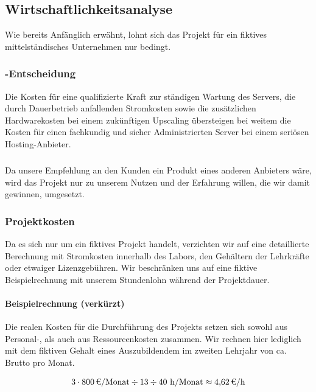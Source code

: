 \subsection{Wirtschaftlichkeitsanalyse}
\label{sec:Wirtschaftlichkeitsanalyse}
    Wie bereits Anfänglich erwähnt, lohnt sich das Projekt für ein fiktives mittelständisches Unternehmen nur bedingt.

\subsubsection{-Entscheidung}
\label{sec:MakeOrBuyEntscheidung}
    Die Kosten für eine qualifizierte Kraft zur ständigen Wartung des Servers, die durch Dauerbetrieb anfallenden Stromkosten sowie die zusätzlichen Hardwarekosten bei einem zukünftigen Upscaling übersteigen bei weitem die Kosten für einen fachkundig und sicher Administrierten Server bei einem seriösen Hosting-Anbieter.
\subparagraph{} Da unsere Empfehlung an den Kunden ein Produkt eines anderen Anbieters wäre, wird das Projekt nur zu unserem Nutzen und der Erfahrung willen, die wir damit gewinnen, umgesetzt.

\subsubsection{Projektkosten}
\label{sec:Projektkosten}
    Da es sich nur um ein fiktives Projekt handelt, verzichten wir auf eine detaillierte Berechnung mit Stromkosten innerhalb des Labors, den Gehältern der Lehrkräfte oder etwaiger Lizenzgebühren. Wir beschränken uns auf eine fiktive Beispielrechnung mit unserem Stundenlohn während der Projektdauer.

\paragraph{Beispielrechnung (verkürzt)}
Die realen Kosten für die Durchführung des Projekts setzen sich sowohl aus Personal-, als auch aus Ressourcenkosten zusammen. Wir rechnen hier lediglich mit dem fiktiven Gehalt eines Auszubildendem im zweiten Lehrjahr von ca.  Brutto pro Monat. 

\begin{eqnarray}
3\cdot \eur{800}\mbox{/Monat} \div {13} \div 40 \mbox{ h/Monat} \approx \eur{4,62}\mbox{/h}
\end{eqnarray}

